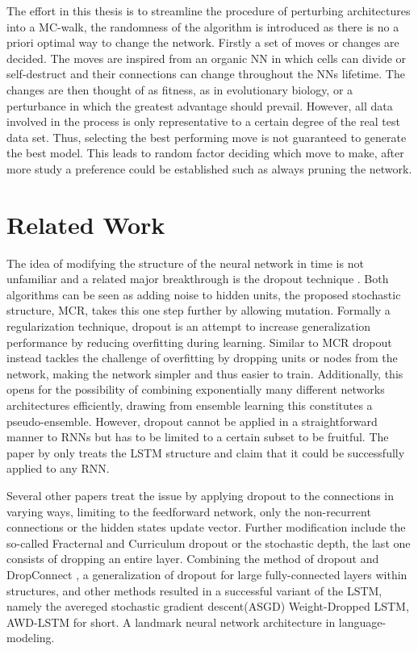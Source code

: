 The effort in this thesis is to streamline the procedure of perturbing architectures into a MC-walk, the randomness of the algorithm is introduced as there is no a priori optimal way to change the network. Firstly a set of moves or changes are decided. The moves are inspired from an organic NN in which cells can divide or self-destruct and their connections can change throughout the NNs lifetime. The changes are then thought of as fitness, as in evolutionary biology, or a perturbance in which the greatest advantage should prevail. However, all data involved in the process is only representative to a certain degree of the real test data set. Thus, selecting the best performing move is not guaranteed to generate the best model. This leads to random factor deciding which move to make, after more study a preference could be established such as always pruning the network.

\section{Related Work}

The idea of modifying the structure of the neural network in time is not unfamiliar and a related major breakthrough is the dropout technique \cite{drop}. Both algorithms can be seen as adding noise to hidden units, the proposed stochastic structure, MCR, takes this one step further by allowing mutation. Formally a regularization technique, dropout is an attempt to increase generalization performance by reducing overfitting during learning. Similar to MCR dropout instead tackles the challenge of overfitting by dropping units or nodes from the network, making the network simpler and thus easier to train. Additionally, this opens for the possibility of combining exponentially many different networks architectures efficiently, drawing from ensemble learning this constitutes a pseudo-ensemble. However, dropout cannot be applied in a straightforward manner to RNNs \cite{dropno} but has to be limited to a certain subset\cite{droprnn} to be fruitful. The paper by \textcite{droprnn} only treats the LSTM structure and claim that it could be successfully applied to any RNN. 

Several other papers treat the issue by applying dropout to the connections in varying ways, limiting to the feedforward network, only the non-recurrent connections or the hidden states update vector. Further modification include the so-called Fracternal and Curriculum dropout or the stochastic depth, the last one consists of dropping an entire layer\cite{stochdep}. Combining the method of dropout and DropConnect \cite{DropConnect}, a generalization of dropout for large fully-connected layers within structures, and other methods resulted in a successful variant of the LSTM, namely the avereged stochastic gradient descent(ASGD) Weight-Dropped LSTM, AWD-LSTM for short. A landmark neural network architecture in language-modeling. 

